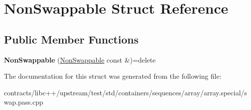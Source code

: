 \hypertarget{struct_non_swappable}{}\section{Non\+Swappable Struct Reference}
\label{struct_non_swappable}
\subsection*{Public Member Functions}
\begin{DoxyCompactItemize}
\item 
\mbox{\label{struct_non_swappable_aee2e0aec9209bcceb29cd8b38c4c3a5b}} 
{\bfseries Non\+Swappable} (\mbox{\hyperlink{struct_non_swappable}{Non\+Swappable}} const \&)=delete
\end{DoxyCompactItemize}


The documentation for this struct was generated from the following file\+:\begin{DoxyCompactItemize}
\item 
contracts/libc++/upstream/test/std/containers/sequences/array/array.\+special/swap.\+pass.\+cpp\end{DoxyCompactItemize}
